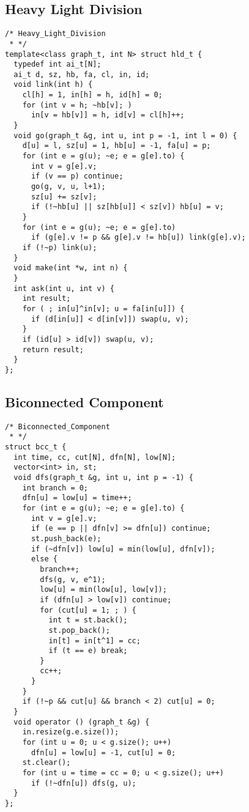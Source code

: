 \subsection{Heavy Light Division}
\begin{lstlisting}
/* Heavy_Light_Division
 * */
template<class graph_t, int N> struct hld_t {
  typedef int ai_t[N];
  ai_t d, sz, hb, fa, cl, in, id;
  void link(int h) {
    cl[h] = 1, in[h] = h, id[h] = 0;
    for (int v = h; ~hb[v]; )
      in[v = hb[v]] = h, id[v] = cl[h]++;
  }
  void go(graph_t &g, int u, int p = -1, int l = 0) {
    d[u] = l, sz[u] = 1, hb[u] = -1, fa[u] = p;
    for (int e = g(u); ~e; e = g[e].to) {
      int v = g[e].v;
      if (v == p) continue;
      go(g, v, u, l+1);
      sz[u] += sz[v];
      if (!~hb[u] || sz[hb[u]] < sz[v]) hb[u] = v;
    }
    for (int e = g(u); ~e; e = g[e].to)
      if (g[e].v != p && g[e].v != hb[u]) link(g[e].v);
    if (!~p) link(u);
  }
  void make(int *w, int n) {
  }
  int ask(int u, int v) {
    int result;
    for ( ; in[u]^in[v]; u = fa[in[u]]) {
      if (d[in[u]] < d[in[v]]) swap(u, v);
    }
    if (id[u] > id[v]) swap(u, v);
    return result;
  }
};
\end{lstlisting}


\subsection{Biconnected Component}
\begin{lstlisting}
/* Biconnected_Component
 * */
struct bcc_t {
  int time, cc, cut[N], dfn[N], low[N];
  vector<int> in, st;
  void dfs(graph_t &g, int u, int p = -1) {
    int branch = 0;
    dfn[u] = low[u] = time++;
    for (int e = g(u); ~e; e = g[e].to) {
      int v = g[e].v;
      if (e == p || dfn[v] >= dfn[u]) continue;
      st.push_back(e);
      if (~dfn[v]) low[u] = min(low[u], dfn[v]);
      else {
        branch++;
        dfs(g, v, e^1);
        low[u] = min(low[u], low[v]);
        if (dfn[u] > low[v]) continue;
        for (cut[u] = 1; ; ) {
          int t = st.back();
          st.pop_back();
          in[t] = in[t^1] = cc;
          if (t == e) break;
        }
        cc++;
      }
    }
    if (!~p && cut[u] && branch < 2) cut[u] = 0;
  }
  void operator () (graph_t &g) {
    in.resize(g.e.size());
    for (int u = 0; u < g.size(); u++)
      dfn[u] = low[u] = -1, cut[u] = 0;
    st.clear();
    for (int u = time = cc = 0; u < g.size(); u++)
      if (!~dfn[u]) dfs(g, u);
  }
};
\end{lstlisting}


